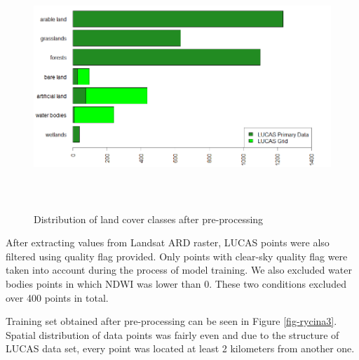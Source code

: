 \documentclass{amuthesis}
\begin{document}
\begin{figure}[t]

{\centering \includegraphics[width=1\textwidth,height=3.64583in]{./figures/lucas_data.png}

}

\caption{\label{fig-rycina2}Distribution of land cover classes after
pre-processing}

\end{figure}

After extracting values from Landsat ARD raster, LUCAS points were also
filtered using quality flag provided. Only points with clear-sky quality
flag were taken into account during the process of model training. We
also excluded water bodies points in which NDWI was lower than 0. These
two conditions excluded over 400 points in total.

Training set obtained after pre-processing can be seen in Figure
\ref{fig-rycina3}. Spatial distribution of data points was fairly even
and due to the structure of LUCAS data set, every point was located at
least 2 kilometers from another one.
\end{document}
